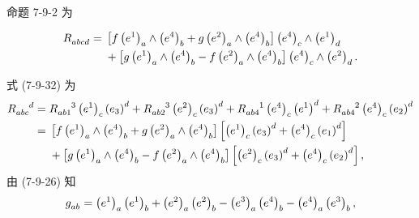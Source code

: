\begin{xiti}
		\begin{zm}
			命题 7-9-2 为
			\begin{Theorem}
				\begin{equation*}
					\begin{split}
						\tensor{R}{_a_b_c_d} ={}& \left[ f \tensor{\left( e^1 \right)}{_a} \wedge \tensor{\left( e^4 \right)}{_b} + g \tensor{\left( e^2 \right)}{_a} \wedge \tensor{\left( e^4 \right)}{_b} \right] \tensor{\left( e^4 \right)}{_c} \wedge \tensor{\left( e^1 \right)}{_d}\\
						& {}+ \left[ g \tensor{\left( e^1 \right)}{_a} \wedge \tensor{\left( e^4 \right)}{_b} - f \tensor{\left( e^2 \right)}{_a} \wedge \tensor{\left( e^4 \right)}{_b} \right] \tensor{\left( e^4 \right)}{_c} \wedge \tensor{\left( e^2 \right)}{_d}.
					\end{split}
				\end{equation*}
			\end{Theorem}
			\begin{Proof}
				式 (7-9-32) 为
				\begin{equation*}
					\begin{split}
						\tensor{R}{_a_b_c^d} ={} & \tensor{R}{_a_b_1^3} \tensor{\left( e^1 \right)}{_c} \tensor{\left( e_3 \right)}{^d} + \tensor{R}{_a_b_2^3} \tensor{\left( e^2 \right)}{_c} \tensor{\left( e_3 \right)}{^d} + \tensor{R}{_a_b_4^1} \tensor{\left( e^4 \right)}{_c} \tensor{\left( e^1 \right)}{^d} + \tensor{R}{_a_b_4^2} \tensor{\left( e^4 \right)}{_c} \tensor{\left( e_2 \right)}{^d}\\
						={}& \left[ f \tensor{\left( e^1 \right)}{_a} \wedge \tensor{\left( e^4 \right)}{_b} + g \tensor{\left( e^2 \right)}{_a} \wedge \tensor{\left( e^4 \right)}{_b} \right] \left[ \tensor{\left( e^1 \right)}{_c} \tensor{\left( e_3 \right)}{^d} + \tensor{\left( e^4 \right)}{_c} \tensor{\left( e_1 \right)}{^d} \right]\\
						&{}+ \left[ g \tensor{\left( e^1 \right)}{_a} \wedge \tensor{\left( e^4 \right)}{_b} - f \tensor{\left( e^2 \right)}{_a} \wedge \tensor{\left( e^4 \right)}{_b} \right] \left[ \tensor{\left( e^2 \right)}{_c} \tensor{\left( e_3 \right)}{^d} + \tensor{\left( e^4 \right)}{_c} \tensor{\left( e_2 \right)}{^d} \right],
					\end{split}
				\end{equation*}
				由 (7-9-26) 知
				\begin{equation*}
					\tensor{g}{_a_b} = \tensor{\left( e^1 \right)}{_a} \tensor{\left( e^1 \right)}{_b} + \tensor{\left( e^2 \right)}{_a} \tensor{\left( e^2 \right)}{_b} - \tensor{\left( e^3 \right)}{_a} \tensor{\left( e^4 \right)}{_b} - \tensor{\left( e^4 \right)}{_a} \tensor{\left( e^3 \right)}{_b},

\end{equation*}
\end{Proof}
\end{zm}
\end{xiti}
